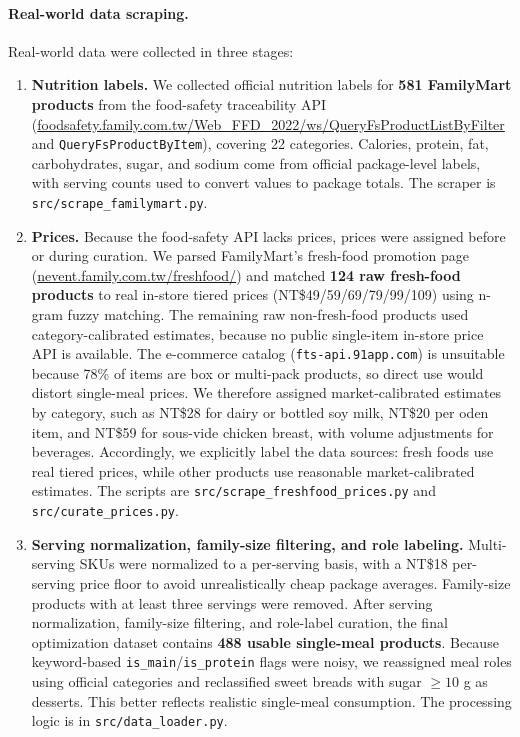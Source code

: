 \documentclass[a4paper]{article}
\begin{document}
\paragraph{Real-world data scraping.}Real-world data were collected in three stages:
\begin{enumerate}
\item \textbf{Nutrition labels.} We collected official nutrition labels for \textbf{581 FamilyMart products} from the food-safety traceability API (\url{foodsafety.family.com.tw/Web_FFD_2022/ws/QueryFsProductListByFilter} and \texttt{QueryFsProductByItem}), covering 22 categories. Calories, protein, fat, carbohydrates, sugar, and sodium come from official package-level labels, with serving counts used to convert values to package totals. The scraper is \texttt{src/scrape\_familymart.py}.
\item \textbf{Prices.} Because the food-safety API lacks prices, prices were assigned before or during curation. We parsed FamilyMart's fresh-food promotion page (\url{nevent.family.com.tw/freshfood/}) and matched \textbf{124 raw fresh-food products} to real in-store tiered prices (NT\$49/59/69/79/99/109) using n-gram fuzzy matching. The remaining raw non-fresh-food products used category-calibrated estimates, because no public single-item in-store price API is available. The e-commerce catalog (\texttt{fts-api.91app.com}) is unsuitable because 78\% of items are box or multi-pack products, so direct use would distort single-meal prices. We therefore assigned market-calibrated estimates by category, such as NT\$28 for dairy or bottled soy milk, NT\$20 per oden item, and NT\$59 for sous-vide chicken breast, with volume adjustments for beverages. Accordingly, we explicitly label the data sources: fresh foods use real tiered prices, while other products use reasonable market-calibrated estimates. The scripts are \texttt{src/scrape\_freshfood\_prices.py} and \texttt{src/curate\_prices.py}.
\item \textbf{Serving normalization, family-size filtering, and role labeling.} Multi-serving SKUs were normalized to a per-serving basis, with a NT\$18 per-serving price floor to avoid unrealistically cheap package averages. Family-size products with at least three servings were removed. After serving normalization, family-size filtering, and role-label curation, the final optimization dataset contains \textbf{488 usable single-meal products}. Because keyword-based \texttt{is\_main}/\texttt{is\_protein} flags were noisy, we reassigned meal roles using official categories and reclassified sweet breads with sugar $\ge 10$ g as desserts. This better reflects realistic single-meal consumption. The processing logic is in \texttt{src/data\_loader.py}.
\end{enumerate}
\end{document}
